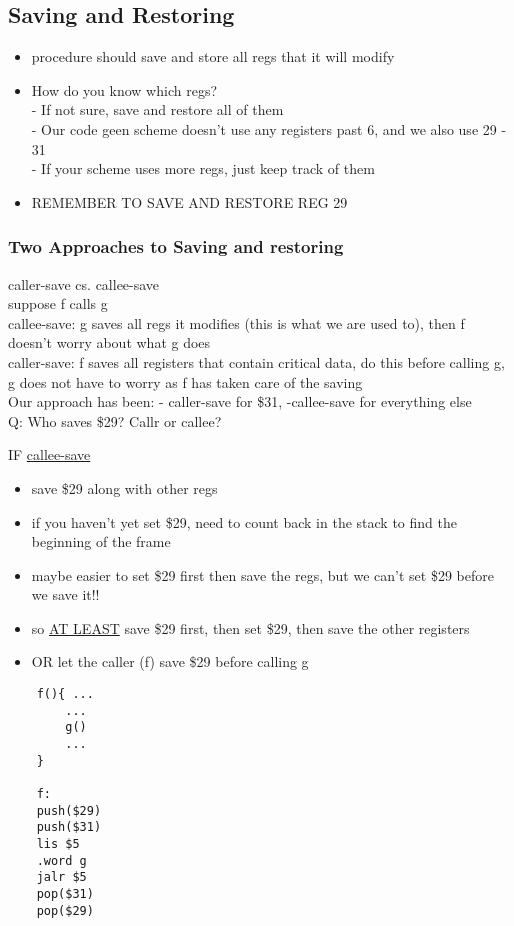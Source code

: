\documentclass[12pt]{article}
\begin{document}
	\subsection*{Saving and Restoring}
	\begin{itemize}
		\item procedure should save and store all regs that it will modify\\
		\item How do you know which regs?\\
		- If not sure, save and restore all of them\\
		- Our code geen scheme doesn't use any registers past 6, and we also use 29 - 31\\
		- If your scheme uses more regs, just keep track of them
		\item REMEMBER TO SAVE AND RESTORE REG 29
	\end{itemize}
	
	\subsubsection*{Two Approaches to Saving and restoring}
	caller-save cs. callee-save\\
	suppose f calls g\\
	
	callee-save: g saves all regs it modifies (this is what we are used to), then f doesn't worry about what g does\\
	
	caller-save: f saves all registers that contain critical data, do this before calling g, g does not have to worry as f has taken care of the saving\\
	
	Our approach has been: - caller-save for \$31, -callee-save for everything else\\
	
	Q: Who saves \$29? Callr or callee?
	
	IF \underline{callee-save}\\
	\begin{itemize}
		\item save \$29 along with other regs
		\item if you haven't yet set \$29, need to count back in the stack to find the beginning of the frame
		\item maybe easier to set \$29 first then save the regs, but we can't set \$29 before we save it!!
		\item so \underline{AT LEAST} save \$29 first, then set \$29, then save the other registers
		\item OR let the caller (f) save \$29 before calling g
	\end{itemize}
	\begin{verbatim}
	f(){ ... 
		...
		g()
		...
	}
	
	f:
	push($29)
	push($31)
	lis $5
	.word g
	jalr $5
	pop($31)
	pop($29)
	\end{verbatim}
	
\end{document}
